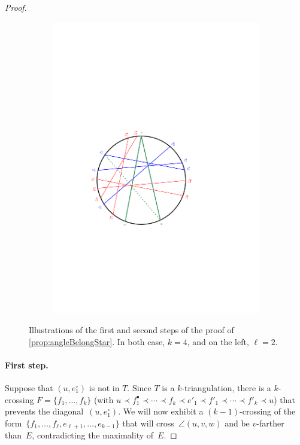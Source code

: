 \documentclass{amsart}
\theoremstyle{remark}
\newcommand{\cl}{\prec}
\begin{document}
\begin{proof}
\begin{figure}
\begin{subfigure}[b]{.48\textwidth}
    \includegraphics[width=\textwidth,page=2]{exProofStar}
  \end{subfigure}
  \caption{Illustrations of the first and second steps of the proof of \cref{prop:angleBelongStar}. In both case, $k=4$, and on the left, $\ell=2$.}
  \label{fig:exProofStar}
\end{figure}

\medskip
\paragraph{\bf First step.}
Suppose that $(u, e^\circ_1)$ is not in $T$. 
Since $T$ is a $k$-triangulation, there is a $k$-crossing $F=\{f_1, \dots, f_k\}$ (with $u \cl f^\bullet_1 \cl \cdots \cl f_k \cl e'_1 \cl f'_1 \cl \cdots \cl f'_k \cl u$) that prevents the diagonal~$(u, e^\circ_1)$. We will now exhibit a $(k-1)$-crossing of the form~$\{f_1, \dots, f_\ell, e_{\ell+1}, \dots, e_{k-1}\}$ that will cross~$\angle(u,v,w)$ and be $v$-farther than~$E$, contradicting the maximality of~$E$.


\end{proof}
\end{document}
